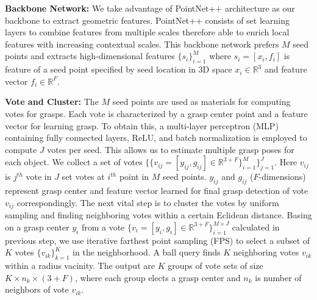 \textbf{Backbone Network:} We take advantage of PointNet++ architecture as our backbone to extract geometric features. PointNet++ consists of set learning layers to combine features from multiple scales therefore able to enrich local features with increasing contextual scales. This backbone network prefers $M$ seed points and extracts high-dimensional features $\lbrace{s_i}\rbrace^{M}_{i=1}$ where $s_i=[x_i,f_i]$ is feature of a seed point specified by seed location in 3D space $x_i \in \mathbb{R}^{3}$ and feature vector $f_i \in \mathbb{R}^{F}$.

\textbf{Vote and Cluster:} The $M$ seed points are used as materials for computing votes for grasps. Each vote is characterized by a grasp center point and a feature vector for learning grasp. To obtain this, a multi-layer perceptron (MLP) containing fully connected layers, ReLU, and batch normalization is employed to compute $J$ votes per seed. This allows us to estimate multiple grasp poses for each object. We collect a set of votes $\lbrace \lbrace v_{ij} = [y_{ij}, g_{ij}] \in \mathbb{R}^{3+F}\rbrace^{M}_{i=1}\rbrace^{J}_{j=1}$. Here $v_{ij}$ is $j^{th}$ vote in $J$ set votes at $i^{th}$ point in $M$ seed points. $y_{ij}$ and $g_{ij}$ ($F$-dimensions) represent grasp center and feature vector learned for final grasp detection of vote $v_{ij}$ correspondingly. The next vital step is to cluster the votes by uniform sampling and finding neighboring votes within a certain Eclidean distance. Basing on a grasp center ${y_i}$ from a vote $\lbrace v_i=[y_i,g_i] \in \mathbb{R}^{3+F} \rbrace^{M \times J}_{i=1}$ calculated in previous step, we use iterative farthest point sampling (FPS) to select a subset of $K$ votes $\lbrace v_{ik} \rbrace^K_{k=1}$ in the neighborhood. A ball query finds $K$ neighboring votes $v_{ik}$ within a radius vacinity. The output are $K$ groups of vote sets of size $K \times n_k \times (3+F)$, where each group elects a grasp center and $n_k$ is number of neighbors of vote $v_{ik}$.

